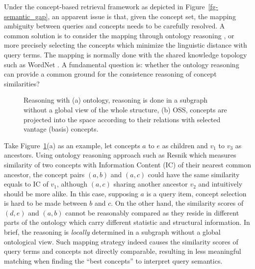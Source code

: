 Under the concept-based retrieval framework as depicted in
Figure~\ref{fg-semantic_gap}, an apparent issue is that, given the
concept set, the mapping ambiguity between queries and concepts
needs to be carefully resolved. A common solution is to consider the
mapping through ontology reasoning
\cite{CeesG.M.Snoek:IEEETM:2006,Anthony.Hoogs:CVPR:2003,Alejandro.Jaimes:ICOIVR:2003,Yi.Wu:IEEEICOME:2004,M.R.Naphade:2005},
or more precisely selecting the concepts which minimize the
linguistic distance with query terms. The mapping is normally done
with the shared knowledge topology such as WordNet
\cite{C.Fellbaum:1998}. A fundamental question is: whether the
ontology reasoning can provide a common ground for the consistence
reasoning of concept similarities?
%
\begin{figure}
 \centering {}
 \centering {}
\caption{Reasoning with (a) ontology, reasoning is done in a
subgraph without a global view of the whole structure, (b) OSS,
concepts are projected into the space according to their relations
with selected vantage (basis) concepts.}\label{fig:CFO_OSS}
\end{figure}
%
Take Figure~\ref{fig:CFO_OSS}(a) as an example, let concepts $a$ to
$e$ as children and $v_1$ to $v_3$ as ancestors. Using ontology
reasoning approach such as Resnik \cite{Philip.Resnik:IJCAI:1995}
which measures similarity of two concepts with Information Content
(IC) \cite{Philip.Resnik:IJCAI:1995} of their nearest common
ancestor, the concept pairs $(a,b)$ and $(a,c)$ could have the same
similarity equals to IC of $v_1$, although $(a,c)$ sharing another
ancestor $v_2$ and intuitively should be more alike. In this case,
supposing $a$ is a query item, concept selection is hard to be made
between $b$ and $c$. On the other hand, the similarity scores of
$(d,e)$ and $(a,b)$ cannot be reasonably compared as they reside in
different parts of the ontology which carry different statistic and
structural information.
%
In brief, the reasoning is {\em locally} determined in a subgraph
without a global ontological view. Such mapping strategy indeed
causes the similarity scores of query terms and concepts not
directly comparable, resulting in less meaningful matching when
finding the ``best concepts'' to interpret query semantics.

